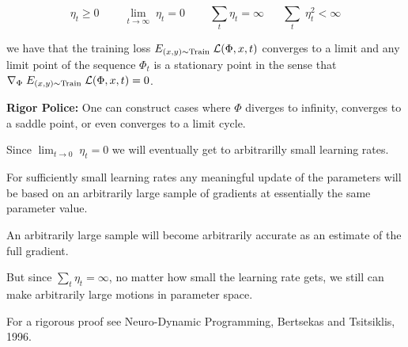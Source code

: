 \vfill
$$\eta_t \geq 0\;\;\;\;\;\;\;\;\lim_{t \rightarrow \infty} \;\eta_t = 0\;\;\;\;\;\;\;\;\sum_t \eta_t = \infty \;\;\;\;\;\;\sum_t \;\eta_t^2 < \infty$$

\vfill
we have that the training loss $E_{(x,y) \sim \mathrm{Train}}\; {\cal L}(\Phi,x,t)$ converges to a limit and any limit point of the sequence $\Phi_t$
is a stationary point in the sense that {\huge  $\nabla_\Phi \; E_{(x,y) \sim \mathrm{Train}} \;{\cal L}(\Phi,x,t) = 0$}.

\vfill
{\Large
\vfill
{\bf Rigor Police:} One can construct cases where $\Phi$ diverges to infinity, converges to a saddle point, or even converges to a limit cycle.

}


Since $\lim_{t \rightarrow 0} \;\eta_t = 0$ we will eventually get to arbitrarilly small learning rates.

\vfill
For sufficiently small learning rates any meaningful update of the parameters will be based on an arbitrarily large sample
of gradients at essentially the same parameter value.

\vfill
An arbitrarily large sample will become arbitrarily accurate as an estimate of the full gradient.

\vfill
But since $\sum_t \eta_t = \infty$, no matter how small the learning rate gets, we still can make arbitrarily large motions in parameter space.


\vfill
{\Large
\vfill
For a rigorous proof see Neuro-Dynamic Programming, Bertsekas and Tsitsiklis, 1996.}
